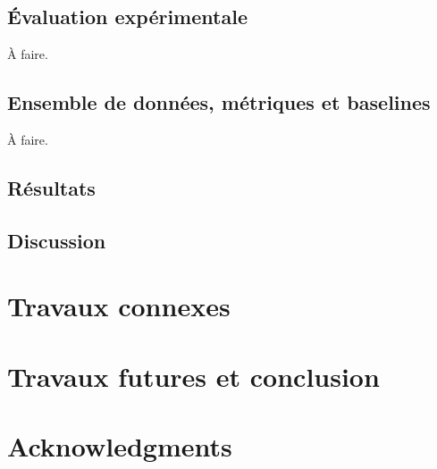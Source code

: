 \documentclass[11pt,a4paper, french]{article}
\begin{document}
\subsection{Évaluation expérimentale }

À faire.

\subsection{Ensemble de données, métriques et baselines }

À faire. 



\subsection{Résultats}


\subsection{Discussion}


\section{Travaux connexes}



\section{Travaux futures et conclusion }

\section*{Acknowledgments}
 

%
%

\appendix
\end{document}
